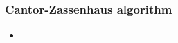 \begin{frame}
\frametitle{Cantor-Zassenhaus algorithm}
\begin{itemize}
\item 
\end{itemize}
\end{frame}
